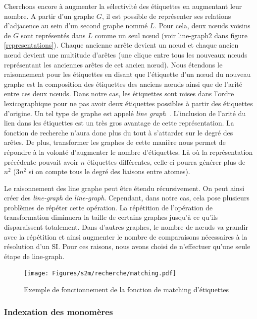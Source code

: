 Cherchons encore à augmenter la sélectivité des étiquettes en augmentant leur nombre.
A partir d'un graphe $G$, il est possible de représenter ses relations d'adjacence au sein d'un second graphe nommé $L$.
Pour cela, deux n\oe{}uds voisins de $G$ sont représentés dans $L$ comme un seul n\oe{}ud (voir line-graph2 dans figure \ref{representations}).
Chaque ancienne arrête devient un n\oe{}ud et chaque ancien n\oe{}ud devient une multitude d'arêtes (une clique entre tous les nouveaux n\oe{}uds représentant les anciennes arêtes de cet ancien n\oe{}ud).
Nous étendons le raisonnement pour les étiquettes en disant que l'étiquette d'un n\oe{}ud du nouveau graphe est la composition des étiquettes des anciens n\oe{}uds ainsi que de l'arité entre ces deux n\oe{}uds.
Dans notre cas, les étiquettes sont mises dans l'ordre lexicographique pour ne pas avoir deux étiquettes possibles à partir des étiquettes d'origine.
Un tel type de graphe est appelé \textit{line graph}~\cite{orlin_line-digraphs_1978}.
L'inclusion de l'arité du lien dans les étiquettes est un très gros avantage de cette représentation.
La fonction de recherche n'aura donc plus du tout à s'attarder sur le degré des arêtes.
De plus, transformer les graphes de cette manière nous permet de répondre à la volonté d'augmenter le nombre d'étiquettes.
Là où la représentation précédente pouvait avoir $n$ étiquettes différentes, celle-ci pourra générer plus de $n^2$ ($3n^2$ si on compte tous le degré des liaisons entre atomes).

Le raisonnement des line graphe peut être étendu récursivement.
On peut ainsi créer des \textit{line-graph} de \textit{line-graph}.
Cependant, dans notre cas, cela pose plusieurs problèmes de répéter cette opération.
La répétition de l'opération de transformation diminuera la taille de certains graphes jusqu'à ce qu'ils disparaissent totalement.
Dans d'autres graphes, le nombre de n\oe{}uds va grandir avec la répétition et ainsi augmenter le nombre de comparaisons nécessaires à la résolution d'un SI.
Pour ces raisons, nous avons choisi de n'effectuer qu'une seule étape de line-graph.

\begin{figure}[!ht]
  \texttt{[image: Figures/s2m/recherche/matching.pdf]}
  \caption{\label{label_matching}Exemple de fonctionnement de la fonction de matching d'étiquettes}
\end{figure}

\subsubsection{Indexation des monomères}

